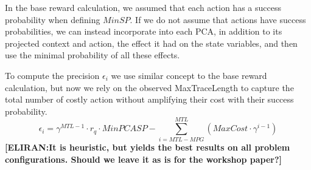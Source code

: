 \documentclass[letterpaper]{article} %
\newcommand{\eliran}[1]{\textbf{[\color{red}ELIRAN:#1]}}
\newcommand{\guy}[1]{\textbf{[\color{orange}GUY:#1]}}
\begin{document}

In the base reward calculation, we assumed that each action has a success probability when defining $MinSP$. If we do not assume that actions have success probabilities, we can instead incorporate into each PCA, in addition to its projected context and action, the effect it had on the state variables, and then use the minimal probability of all these effects.

To compute the precision $\epsilon_i$ we use similar concept to the base reward calculation, but now we rely on the observed MaxTraceLength to capture the total number of costly action without amplifying their cost with their success probability.
\begin{equation}
\label{eqn:rq}
   \epsilon_i = \gamma^{MTL-1}\cdot r_q \cdot MinPCASP - \sum_{i=MTL - MPG }^{MTL}(MaxCost \cdot \gamma^{i-1})
\end{equation}
\eliran{It is heuristic, but yields the best results on all problem configurations. Should we leave it as is for the workshop paper?}
\end{document}
